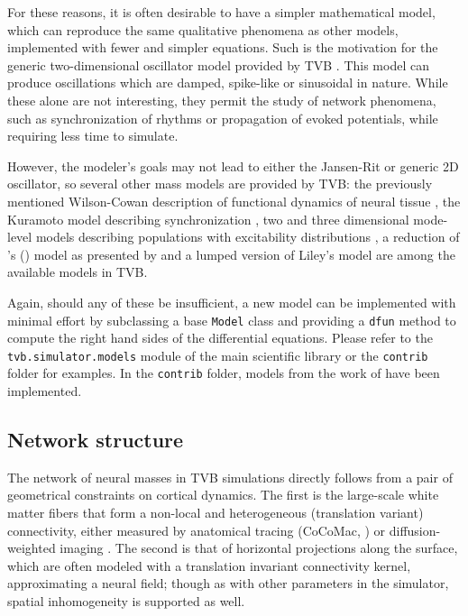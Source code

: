 	For these reasons, it is often desirable to have a simpler mathematical 
	model, which can reproduce the same qualitative phenomena as other 
	models, implemented with fewer and simpler equations. Such is the motivation
	for the generic two-dimensional oscillator model 
    provided by TVB 
    \citep{strogatz2001nonlinear, guckenheimer1983nonlinear}.
	This model can produce oscillations which are damped, spike-like or 
	sinusoidal in nature. While these alone are not interesting, they 
	permit the study of network phenomena, such as synchronization of rhythms
	or propagation of evoked potentials, while requiring less time to simulate.

	However, the modeler's goals may not lead to either the Jansen-Rit
	 or generic 2D oscillator, so several other mass models are
	provided by TVB: the previously mentioned Wilson-Cowan description of
	functional dynamics of neural tissue \citep{Wilson_1972}, the Kuramoto
	model describing synchronization \citep{Kuramoto_1975, Cabral_2011}, two
	and three dimensional mode-level models describing populations with
	excitability distributions \citep{Stefanescu_2011, Stefanescu_2008}, a
	reduction of \citeauthor{Wong_2006}'s (\citeyear{Wong_2006}) model as presented 
    by
	\cite{Deco_2013} and a lumped version of 
    Liley's model \citep{Liley_1999, Steyn-Ross_1999} 
    are among the available models in TVB.

	Again, should any of these be insufficient, a new model can be implemented
	with minimal effort by subclassing a base \texttt{Model} class and
	providing a  \texttt{dfun} method to compute the right hand sides of the
	differential  equations. Please refer to the \texttt{tvb.simulator.models}
    module of the main scientific library or the \texttt{contrib} folder
    for
	examples. In the \texttt{contrib} folder, models from the work of 
	\cite{Larter_1999, Breakspear_2003, Morris_1981, Hindmarsh_1984, Brunel_2001}
	have been implemented.

\subsection{Network structure}

	The network of neural masses in TVB simulations directly follows from  a
	pair of geometrical constraints on cortical dynamics. The first is the
	large-scale white matter fibers that form a non-local and heterogeneous
	(translation variant) connectivity, either measured by anatomical tracing
	(CoCoMac, \cite{Koetter_2004}) or diffusion-weighted imaging 
    \citep{Hagmann_2008, Honey_2009, Bastiani_2012}.
    The second is that of horizontal projections
	along the surface, which are often modeled with a translation invariant
    connectivity kernel, approximating a neural field; though as with other
    parameters in the simulator, spatial inhomogeneity is supported as well.

